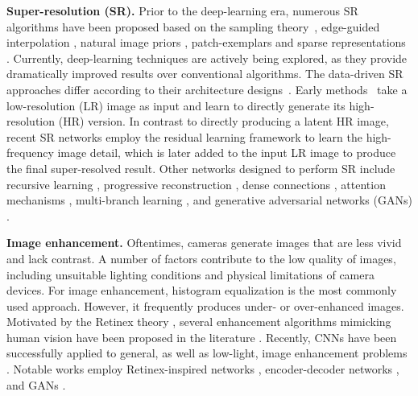 \documentclass[runningheads]{llncs}
\begin{document}
\vspace{0.4em} \noindent\textbf{Super-resolution (SR).} 
Prior to the deep-learning era, numerous SR algorithms have been proposed based on the sampling theory~\cite{keys1981cubic,irani1991improving}, edge-guided interpolation \cite{allebach1996edge,zhang2006edge}, natural image priors \cite{kim2010single,xiong2010robust}, patch-exemplars \cite{chang2004super,freedman2011image} and sparse representations \cite{yang2010image,yang2008image}. 
Currently, deep-learning techniques are actively being explored, as they provide dramatically improved results over conventional algorithms. 
The data-driven SR approaches differ according to their architecture designs~\cite{wang2019deep,anwar2019deep,ntire2019_superresolution}. Early methods~\cite{dong2014learning,dong2015image} take a low-resolution (LR) image as input and learn to directly generate its high-resolution (HR) version. 
In contrast to directly producing a latent HR image, recent SR networks \cite{VDSR,tai2017memnet,tai2017image,hui2018fast} employ the residual learning framework \cite{He2016} to learn the high-frequency image detail, which is later added to the input LR image to produce the final super-resolved result.
Other networks designed to perform SR include recursive learning \cite{kim2016deeply,han2018image,ahn2018fast}, progressive reconstruction \cite{wang2015deep,Lai2017}, dense connections \cite{tong2017image,wang2018esrgan,zhang2020residual}, attention mechanisms \cite{RCAN,dai2019second,zhang2019residual}, multi-branch learning \cite{Lai2017,EDSR,dahl2017pixel,li2018multi}, and generative adversarial networks (GANs) \cite{wang2018esrgan,park2018srfeat,sajjadi2017enhancenet,SRResNet}. 


\vspace{0.4em}\noindent\textbf{Image enhancement.}
Oftentimes, cameras generate images that are less vivid and lack contrast. A number of factors contribute to the low quality of images, including unsuitable lighting conditions and physical limitations of camera devices. 
For image enhancement, histogram equalization is the most commonly used approach. However, it frequently produces under- or over-enhanced images. Motivated by the Retinex theory \cite{land1977retinex}, several enhancement algorithms mimicking human vision have been proposed in the literature \cite{bertalmio2007,palma2008perceptually,jobson1997multiscale,rizzi2004retinex}.
Recently, CNNs have been successfully applied to general, as well as low-light, image enhancement problems \cite{ntire2019_enhancement}. Notable works employ Retinex-inspired networks \cite{Shen2017,wei2018deep,zhang2019kindling}, encoder-decoder networks \cite{chen2018encoder,Lore2017,ren2019low}, and GANs \cite{chen2018deep,ignatov2018wespe,deng2018aesthetic}.
\end{document}
